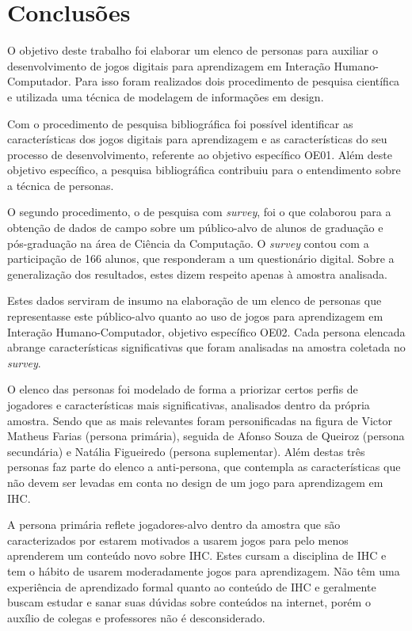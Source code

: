 
\chapter{Conclusões}
\label{chap:cons}

O objetivo deste trabalho foi elaborar um elenco de personas para auxiliar o desenvolvimento de jogos digitais para aprendizagem em Interação Humano-Computador. Para isso foram realizados dois procedimento de pesquisa científica e utilizada uma técnica de modelagem de informações em design. 

Com o procedimento de pesquisa bibliográfica foi possível identificar as características dos jogos digitais para aprendizagem e as características do seu processo de desenvolvimento, referente ao objetivo específico OE01. Além deste objetivo específico, a pesquisa bibliográfica contribuiu para o entendimento sobre a técnica de personas.

O segundo procedimento, o de pesquisa com \textit{survey}, foi o que colaborou para a obtenção de dados de campo sobre um público-alvo de alunos de graduação e pós-graduação na área de Ciência da Computação. O \textit{survey} contou com a participação de 166 alunos, que responderam a um questionário digital. Sobre a generalização dos resultados, estes dizem respeito apenas à amostra analisada.

Estes dados serviram de insumo na elaboração de um elenco de personas que representasse este público-alvo quanto ao uso de jogos para aprendizagem em Interação Humano-Computador, objetivo específico OE02. Cada persona elencada abrange características significativas que foram analisadas na amostra coletada no \textit{survey}.

O elenco das personas foi modelado de forma a priorizar certos perfis de jogadores e características mais significativas, analisados dentro da própria amostra. Sendo que as mais relevantes foram personificadas na figura de Victor Matheus Farias (persona primária), seguida de Afonso Souza de Queiroz (persona secundária) e Natália Figueiredo (persona suplementar). Além destas três personas faz parte do elenco a anti-persona, que contempla as características que não devem ser levadas em conta no design de um jogo para aprendizagem em IHC.

A persona primária reflete jogadores-alvo dentro da amostra que são caracterizados por estarem motivados a usarem jogos para pelo menos aprenderem um conteúdo novo sobre IHC. Estes cursam a disciplina de IHC e tem o hábito de usarem moderadamente jogos para aprendizagem. Não têm uma experiência de aprendizado formal quanto ao conteúdo de IHC e geralmente buscam estudar e sanar suas dúvidas sobre conteúdos na internet, porém o auxílio de colegas e professores não é desconsiderado.

